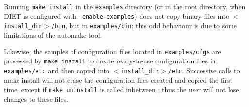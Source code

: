 Running \texttt{make install} in the \texttt{examples} directory (or
in the root directory, when DIET is configured with
\texttt{--enable-examples}) does not copy binary files into
\texttt{$<$install\_dir$>$/bin}, but in \texttt{examples/bin}: this
odd behaviour is due to some limitations of the \textsf{automake} tool.

Likewise, the samples of configuration files located in
\texttt{examples/cfgs} are processed by \texttt{make install} to
create ready-to-use configuration files in \texttt{examples/etc} and
then copied into \texttt{$<$install\_dir$>$/etc}. Successive calls to
make install will not erase the configuration files created and copied
the first time, except if \texttt{make uninstall} is called inbetween
; thus the user will not lose changes to these files.

